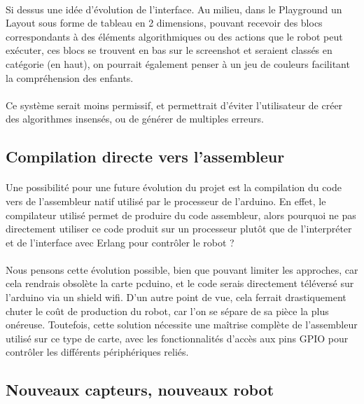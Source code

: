 \documentclass[a4paper]{article}
\begin{document}
\paragraph{}
Si dessus une idée d’évolution de l’interface. Au milieu, dans le Playground un Layout sous forme de tableau en 2 dimensions, pouvant recevoir des blocs correspondants à des éléments algorithmiques ou des actions que le robot peut exécuter, ces blocs se trouvent en bas sur le screenshot et seraient classés en catégorie (en haut), on pourrait également penser à un jeu de couleurs facilitant la compréhension des enfants.

\paragraph{}
Ce système serait moins permissif, et permettrait d’éviter l’utilisateur de créer des algorithmes insensés, ou de générer de multiples erreurs.

\subsection{Compilation directe vers l’assembleur}
\paragraph{}
Une possibilité pour une future évolution du projet est la compilation du code vers de l’assembleur natif utilisé par le processeur de l’arduino. En effet, le compilateur utilisé permet de produire du code assembleur, alors pourquoi ne pas directement utiliser ce code produit sur un processeur plutôt que de l'interpréter et de l'interface avec Erlang pour contrôler le robot ? 

\paragraph{}
Nous pensons cette évolution possible, bien que pouvant limiter les approches, car cela rendrais obsolète la carte pcduino, et le code serais directement téléversé sur l’arduino via un shield wifi. D’un autre point de vue, cela ferrait drastiquement chuter le coût de production du robot, car l’on se sépare de sa pièce la plus onéreuse.
Toutefois, cette solution nécessite une maîtrise complète de l’assembleur utilisé sur ce type de carte, avec les fonctionnalités d’accès aux pins GPIO pour contrôler les différents périphériques reliés.

\subsection{Nouveaux capteurs, nouveaux robot}
\end{document}
